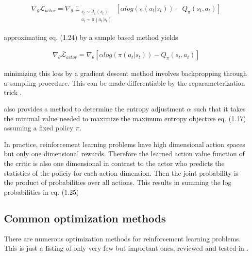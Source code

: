 \begin{align}
\nabla_\theta \mathcal{L}_{actor} = \nabla_\theta \mathop{\mathbb{E}}_{\substack{s_t \sim d_\pi(s_t) \\ a_t \sim \pi(a_t|s_t)}} \left[ \alpha log(\pi(a_t|s_t)) - Q_\pi(s_t, a_t) \right]
\end{align}

approximating eq. (1.24) by a sample based method yields

\begin{align}
\nabla_\theta \bar{\mathcal{L}}_{actor} = \nabla_\theta \left[ \alpha log(\pi(a_t|s_t)) - Q_\pi(s_t, a_t) \right]
\end{align}

minimizing this loss by a gradient descent method involves backpropping through a sampling procedure. This can be made differentiable by the reparameterization trick \cite{kingma2013autoencoding}.

\cite{haarnoja2018soft} also provides a method to determine the entropy adjustment $\alpha$ such that it takes the minimal value needed to maximize the maximum entropy objective eq. (1.17) assuming a fixed policy $\pi$.

In practice, reinforcement learning problems have high dimensional action spaces but only one dimensional rewards. Therefore the learned action value function of the critic is also one dimensional in contrast to the actor who predicts the statistics of the policiy for each action dimension. Then the joint probability is the product of probabilities over all actions. This results in summing the log probabilities in eq. (1.25)

\subsection{Common optimization methods}
There are numerous optimization methods for reinforcement learning problems. This is just a listing of only very few but important ones, reviewed and tested in \cite{hessel2017rainbow}.


